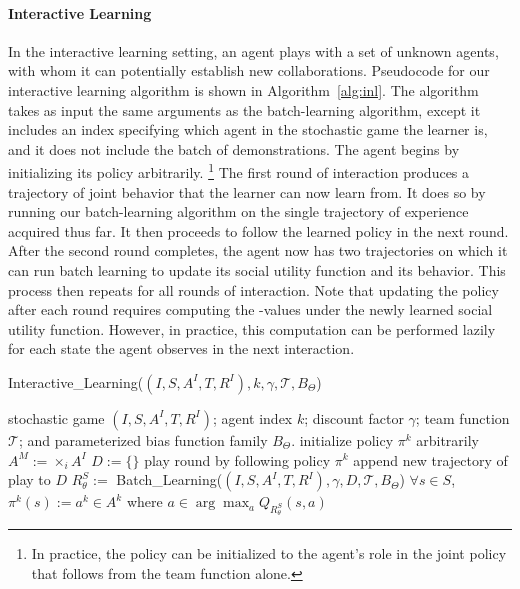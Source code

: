 
\vspace{\up}
\paragraph{Interactive Learning}
\label{sec:interactive}

In the interactive learning setting, an agent plays with a set of
unknown agents, with whom it can potentially establish new
collaborations.  Pseudocode for our interactive learning algorithm is
shown in Algorithm~\ref{alg:inl}. The algorithm takes as input the
same arguments as the batch-learning algorithm, except it includes an
index specifying which agent in the stochastic game the learner is,
and it does not include the batch of demonstrations. The agent begins
by initializing its policy arbitrarily.%
\footnote{In practice, the policy can be initialized to the agent's role
in the joint policy that follows from the team function alone.}
%
The first round of interaction produces a trajectory of joint behavior
that the learner can now learn from.  It does so by running our batch-learning algorithm on the single trajectory of experience acquired
thus far.  It then proceeds to follow the learned policy in the next
round.  After the second round completes, the agent now has two
trajectories on which it can run batch learning to update its social
utility function and its behavior.  This process then repeats for all
rounds of interaction.  
%
Note that updating the policy after each round requires computing the
\Q-values under the newly learned social utility function.  However,
in practice, this computation can be performed lazily for each state
the agent observes in the next interaction.

\begin{algorithm}[t]
\caption{Interactive\_Learning($(I,S,A^I,T,R^I), k, \gamma, {\mathcal T}, B_\Theta$)}
\label{alg:inl}
\begin{algorithmic}
\Require stochastic game $(I,S,A^I,T,R^I)$; agent index $k$; discount factor $\gamma$; team function ${\mathcal T}$; and parameterized bias function family $B_\Theta$.
\State initialize policy $\pi^k$ arbitrarily
\State $A^M := \times_i A^I$ 
\State $D := \{\}$
\State play round by following policy $\pi^k$ %
\State append new trajectory of play to $D$
\State $R^S_\theta :=$ Batch\_Learning($(I,S,A^I,T,R^I), \gamma, D, {\mathcal T}, B_\Theta$)
\State $\forall s \in S$, $\pi^k(s) := a^k \in A^k$ where $a \in \arg \max_a Q_{R^S_\theta}(s, a)$
\EndFor 
\end{algorithmic}
\end{algorithm}
